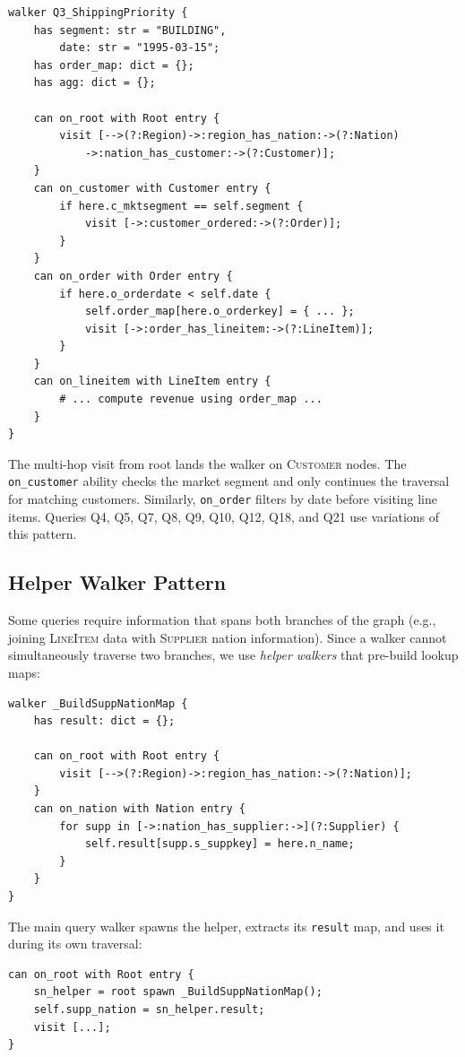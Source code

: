 \documentclass[11pt]{article}
\begin{document}
\begin{lstlisting}
walker Q3_ShippingPriority {
    has segment: str = "BUILDING",
        date: str = "1995-03-15";
    has order_map: dict = {};
    has agg: dict = {};

    can on_root with Root entry {
        visit [-->(?:Region)->:region_has_nation:->(?:Nation)
            ->:nation_has_customer:->(?:Customer)];
    }
    can on_customer with Customer entry {
        if here.c_mktsegment == self.segment {
            visit [->:customer_ordered:->(?:Order)];
        }
    }
    can on_order with Order entry {
        if here.o_orderdate < self.date {
            self.order_map[here.o_orderkey] = { ... };
            visit [->:order_has_lineitem:->(?:LineItem)];
        }
    }
    can on_lineitem with LineItem entry {
        # ... compute revenue using order_map ...
    }
}
\end{lstlisting}

The multi-hop visit from root lands the walker on \textsc{Customer} nodes.
The \lstinline|on_customer| ability checks the market segment and only
continues the traversal for matching customers.
Similarly, \lstinline|on_order| filters by date before visiting line items.
Queries Q4, Q5, Q7, Q8, Q9, Q10, Q12, Q18, and Q21 use variations of
this pattern.

\subsection{Helper Walker Pattern}

Some queries require information that spans both branches of the graph
(e.g., joining \textsc{LineItem} data with \textsc{Supplier} nation
information).
Since a walker cannot simultaneously traverse two branches, we use
\emph{helper walkers} that pre-build lookup maps:

\begin{lstlisting}
walker _BuildSuppNationMap {
    has result: dict = {};

    can on_root with Root entry {
        visit [-->(?:Region)->:region_has_nation:->(?:Nation)];
    }
    can on_nation with Nation entry {
        for supp in [->:nation_has_supplier:->](?:Supplier) {
            self.result[supp.s_suppkey] = here.n_name;
        }
    }
}
\end{lstlisting}

The main query walker spawns the helper, extracts its \lstinline|result|
map, and uses it during its own traversal:

\begin{lstlisting}
can on_root with Root entry {
    sn_helper = root spawn _BuildSuppNationMap();
    self.supp_nation = sn_helper.result;
    visit [...];
}
\end{lstlisting}
\end{document}
